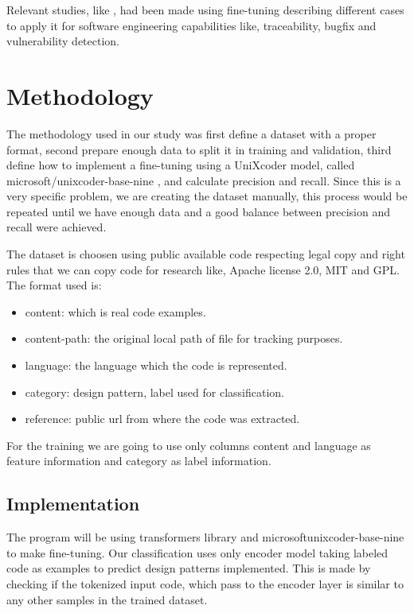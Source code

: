 \documentclass[conference]{IEEEtran}
\begin{document}
Relevant studies, like \cite{MAJIDZADEH2024103850}\cite{10298587}\cite{10298532}, had been made using fine-tuning describing different cases to apply it for software engineering capabilities like, traceability, bugfix and vulnerability detection.

\section{Methodology}

The methodology used in our study was first define a dataset with a proper format, second prepare enough data to split it in training and validation, third define how to implement a fine-tuning using a UniXcoder model, called microsoft/unixcoder-base-nine \cite{guo2022unixcoder}, and calculate precision and recall.
Since this is a very specific problem, we are creating the dataset manually, this process would be repeated until we have enough data and a good balance between precision and recall were achieved.

The dataset is choosen using public available code respecting legal copy and right rules that we can copy code for research like, Apache license 2.0, MIT and GPL.
The format used is:
\begin{itemize}
    \item content: which is real code examples.
    \item content-path: the original local path of file for tracking purposes.
    \item language: the language which the code is represented.
    \item category: design pattern, label used for classification.
    \item reference: public url from where the code was extracted.
\end{itemize}

For the training we are going to use only columns content and language as feature information and category as label information.

\subsection{Implementation}


The program will be using transformers library and microsoft\/unixcoder-base-nine\cite{guo2022unixcoder} to make fine-tuning.
Our classification uses only encoder model taking labeled code as examples to predict design patterns implemented. 
This is made by checking if the tokenized input code, which pass to the encoder layer is similar to any other samples in the trained dataset.
\end{document}
